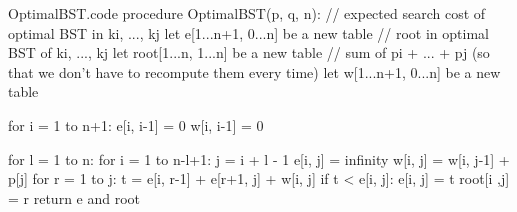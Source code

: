 \documentclass[a4paper]{article}
\begin{document}
\begin{filecontents*}[overwrite]{OptimalBST.code}
procedure OptimalBST(p, q, n):
    // expected search cost of optimal BST in ki, ..., kj
    let e[1...n+1, 0...n] be a new table
    // root in optimal BST of ki, ..., kj
    let root[1...n, 1...n] be a new table
    // sum of pi + ... + pj (so that we don't have to recompute them every time)
    let w[1...n+1, 0...n] be a new table

    for i = 1 to n+1:
        e[i, i-1] = 0
        w[i, i-1] = 0

    for l = 1 to n:
        for i = 1 to n-l+1:
            j = i + l - 1
            e[i, j] = infinity
            w[i, j] = w[i, j-1] + p[j]
            for r = 1 to j:
                t = e[i, r-1] + e[r+1, j] + w[i, j]
                if t < e[i, j]:
                    e[i, j] = t
                    root[i ,j] = r
    return e and root
\end{filecontents*}


\end{document}
